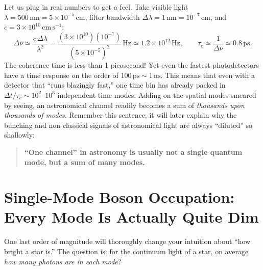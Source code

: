Let us plug in real numbers to get a feel. Take visible light \(\lambda=500\,\mathrm{nm}=5\times10^{-5}\,\mathrm{cm}\), filter bandwidth \(\Delta\lambda=1\,\mathrm{nm}=10^{-7}\,\mathrm{cm}\), and \(c=3\times10^{10}\,\mathrm{cm\,s^{-1}}\):
\[
  \Delta\nu\simeq\frac{c\,\Delta\lambda}{\lambda^2}
  =\frac{(3\times10^{10})(10^{-7})}{(5\times10^{-5})^2}\,\mathrm{Hz}
  \simeq1.2\times10^{12}\,\mathrm{Hz},
  \qquad
  \tau_c\simeq\frac1{\Delta\nu}\simeq0.8\,\mathrm{ps}.
\]
The coherence time is less than 1 picosecond! Yet even the fastest photodetectors have a time response on the order of \(100\,\mathrm{ps}\sim1\,\mathrm{ns}\). This means that even with a detector that ``runs blazingly fast,'' one time bin has already packed in \(\Delta t/\tau_c\sim10^2\)--\(10^3\) independent time modes. Adding on the spatial modes smeared by seeing, an astronomical channel readily becomes a sum of \emph{thousands upon thousands of modes}. Remember this sentence; it will later explain why the bunching and non-classical signals of astronomical light are always ``diluted'' so shallowly:

\begin{quote}
\textbf{``One channel'' in astronomy is usually not a single quantum mode, but a sum of many modes.}
\end{quote}

\section{Single-Mode Boson Occupation: Every Mode Is Actually Quite Dim}
\label{sec:e05-occupation}

One last order of magnitude will thoroughly change your intuition about ``how bright a star is.'' The question is: for the continuum light of a star, on average \emph{how many photons are in each mode}?

